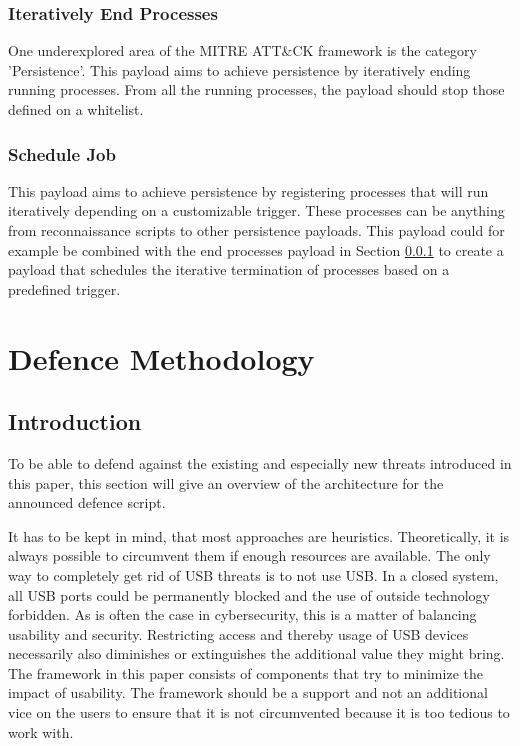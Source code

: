 \subsubsection{Iteratively End Processes} \label{Iteratively End Processes}

One underexplored area of the MITRE ATT\&CK framework is the category 'Persistence'. This payload aims to achieve persistence by iteratively ending running processes. From all the running processes, the payload should stop those defined on a whitelist.


\subsubsection{Schedule Job}

This payload aims to achieve persistence by registering processes that will run iteratively depending on a customizable trigger. These processes can be anything from reconnaissance scripts to other persistence payloads. This payload could for example be combined with the end processes payload in Section \ref{Iteratively End Processes} to create a payload that schedules the iterative termination of processes based on a predefined trigger.



\section{Defence Methodology} \label{Defence Methodology}

\subsection{Introduction}

To be able to defend against the existing and especially new threats introduced in this paper, this section will give an overview of the architecture for the announced defence script.

It has to be kept in mind, that most approaches are heuristics. Theoretically, it is always possible to circumvent them if enough resources are available. The only way to completely get rid of USB threats is to not use USB. In a closed system, all USB ports could be permanently blocked and the use of outside technology forbidden. As is often the case in cybersecurity, this is a matter of balancing usability and security. Restricting access and thereby usage of USB devices necessarily also diminishes or extinguishes the additional value they might bring. The framework in this paper consists of components that try to minimize the impact of usability. The framework should be a support and not an additional vice on the users to ensure that it is not circumvented because it is too tedious to work with.  

